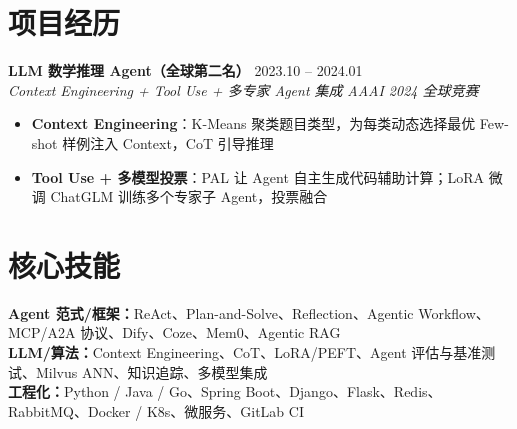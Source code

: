 \documentclass[10pt,a4paper]{article}
\newcommand{\expentry}[4]{%
  \noindent\textbf{#1} \hfill #4 \\[-3pt]
  \textit{#3} \hfill \textit{#2} \vspace{0pt}
}
\begin{document}
\section{项目经历}

\expentry{LLM 数学推理 Agent（全球第二名）}{AAAI 2024 全球竞赛}{Context Engineering + Tool Use + 多专家 Agent 集成}{2023.10 -- 2024.01}
\begin{itemize}
  \item \textbf{Context Engineering}：K-Means 聚类题目类型，为每类动态选择最优 Few-shot 样例注入 Context，CoT 引导推理
  \item \textbf{Tool Use + 多模型投票}：PAL 让 Agent 自主生成代码辅助计算；LoRA 微调 ChatGLM 训练多个专家子 Agent，投票融合
\end{itemize}

\section{核心技能}

{\small
\noindent\textbf{Agent 范式/框架：}ReAct、Plan-and-Solve、Reflection、Agentic Workflow、MCP/A2A 协议、Dify、Coze、Mem0、Agentic RAG \\[1pt]
\textbf{LLM/算法：}Context Engineering、CoT、LoRA/PEFT、Agent 评估与基准测试、Milvus ANN、知识追踪、多模型集成 \\[1pt]
\textbf{工程化：}Python / Java / Go、Spring Boot、Django、Flask、Redis、RabbitMQ、Docker / K8s、微服务、GitLab CI
}
\end{document}
